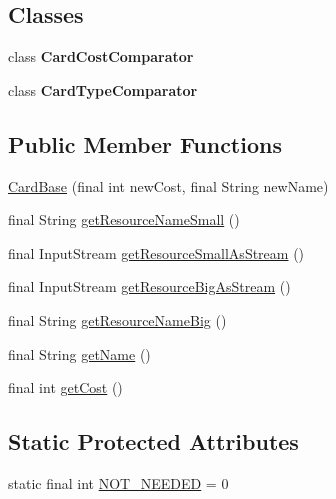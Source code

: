 \subsection*{\-Classes}
\begin{DoxyCompactItemize}
\item 
class {\bfseries \-Card\-Cost\-Comparator}
\item 
class {\bfseries \-Card\-Type\-Comparator}
\end{DoxyCompactItemize}
\subsection*{\-Public \-Member \-Functions}
\begin{DoxyCompactItemize}
\item 
\hyperlink{classdominion_1_1model_1_1cards_1_1CardBase_a0b27fda0d25fc755a55f1a81c1c1848a}{\-Card\-Base} (final int new\-Cost, final \-String new\-Name)
\item 
final \-String \hyperlink{classdominion_1_1model_1_1cards_1_1CardBase_a5c5b6d8a4c33f51047d6c90d343c06e2}{get\-Resource\-Name\-Small} ()
\item 
final \-Input\-Stream \hyperlink{classdominion_1_1model_1_1cards_1_1CardBase_aa447a96327bfd71efa3dd18968c71476}{get\-Resource\-Small\-As\-Stream} ()
\item 
final \-Input\-Stream \hyperlink{classdominion_1_1model_1_1cards_1_1CardBase_a2d9336e2def7dbefde9c227afeffa486}{get\-Resource\-Big\-As\-Stream} ()
\item 
final \-String \hyperlink{classdominion_1_1model_1_1cards_1_1CardBase_a049471f7f034646f8e359a79212d2006}{get\-Resource\-Name\-Big} ()
\item 
final \-String \hyperlink{classdominion_1_1model_1_1cards_1_1CardBase_a9ffde2cf05b208bd739e6684b532c53e}{get\-Name} ()
\item 
final int \hyperlink{classdominion_1_1model_1_1cards_1_1CardBase_a41889be08e66eca55985c6581ec1816e}{get\-Cost} ()
\end{DoxyCompactItemize}
\subsection*{\-Static \-Protected \-Attributes}
\begin{DoxyCompactItemize}
\item 
static final int \hyperlink{classdominion_1_1model_1_1cards_1_1CardBase_a5e7cbf78336445ec7ceb2ebe43dca811}{\-N\-O\-T\-\_\-\-N\-E\-E\-D\-E\-D} = 0
\end{DoxyCompactItemize}


